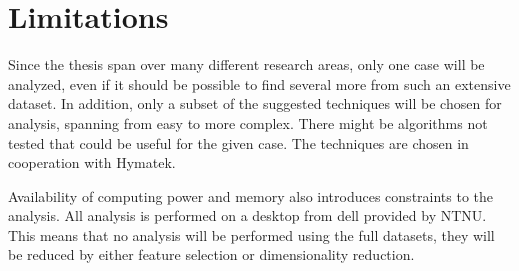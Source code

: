     

    
    
    

\section{Limitations}\label{sec:assumptions}
    Since the thesis span over many different research areas, only one case will be analyzed, even if it should be possible to find several more from such an extensive dataset. In addition, only a subset of the suggested techniques will be chosen for analysis, spanning from easy to more complex. There might be algorithms not tested that could be useful for the given case. The techniques are chosen in cooperation with Hymatek. 
    
    Availability of computing power and memory also introduces constraints to the analysis. All analysis is performed on a desktop from dell provided by NTNU. This means that no analysis will be performed using the full datasets, they will be reduced by either feature selection or dimensionality reduction. 
    

